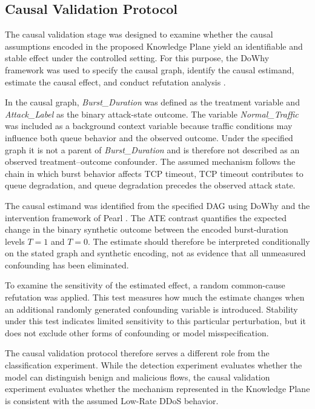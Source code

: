 \documentclass[journal]{IEEEtran}
\begin{document}
\subsection{Causal Validation Protocol}
\label{subsec:causal_validation_protocol}

The causal validation stage was designed to examine whether the causal assumptions encoded in the proposed Knowledge Plane yield an identifiable and stable effect under the controlled setting. For this purpose, the DoWhy framework was used to specify the causal graph, identify the causal estimand, estimate the causal effect, and conduct refutation analysis \cite{sharma2020dowhy}.

In the causal graph, \textit{Burst\_Duration} was defined as the treatment variable and \textit{Attack\_Label} as the binary attack-state outcome. The variable \textit{Normal\_Traffic} was included as a background context variable because traffic conditions may influence both queue behavior and the observed outcome. Under the specified graph it is not a parent of \textit{Burst\_Duration} and is therefore not described as an observed treatment--outcome confounder. The assumed mechanism follows the chain in which burst behavior affects TCP timeout, TCP timeout contributes to queue degradation, and queue degradation precedes the observed attack state.

The causal estimand was identified from the specified DAG using DoWhy and the
intervention framework of Pearl \cite{pearl2009causality}. The ATE contrast
quantifies the expected change in the binary synthetic outcome between the
encoded burst-duration levels $T=1$ and $T=0$. The estimate should therefore
be interpreted conditionally on the stated graph and synthetic encoding, not
as evidence that all unmeasured confounding has been eliminated.

To examine the sensitivity of the estimated effect, a random common-cause refutation was applied. This test measures how much the estimate changes when an additional randomly generated confounding variable is introduced. Stability under this test indicates limited sensitivity to this particular perturbation, but it does not exclude other forms of confounding or model misspecification.

The causal validation protocol therefore serves a different role from the classification experiment. While the detection experiment evaluates whether the model can distinguish benign and malicious flows, the causal validation experiment evaluates whether the mechanism represented in the Knowledge Plane is consistent with the assumed Low-Rate DDoS behavior.
\end{document}
